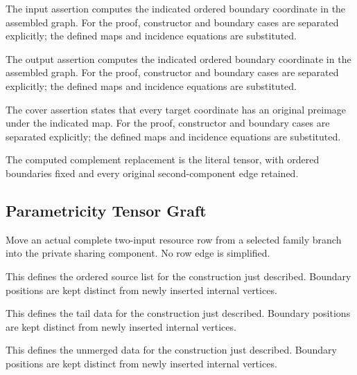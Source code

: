 The input assertion computes the indicated ordered boundary coordinate in the assembled graph.
For the proof, constructor and boundary cases are separated explicitly; the defined maps and incidence equations are substituted.
\par{}

The output assertion computes the indicated ordered boundary coordinate in the assembled graph.
For the proof, constructor and boundary cases are separated explicitly; the defined maps and incidence equations are substituted.
\par{}

The cover assertion states that every target coordinate has an original preimage under the indicated map.
For the proof, constructor and boundary cases are separated explicitly; the defined maps and incidence equations are substituted.
\par{}

The computed complement replacement is the literal tensor, with ordered boundaries fixed and every original second-component edge retained.
\par{}

\subsection{Parametricity Tensor Graft}
Move an actual complete two-input resource row from a selected family branch into the private sharing component. No row edge is simplified.

This defines the ordered source list for the construction just described. Boundary positions are kept distinct from newly inserted internal vertices.
\par{}

This defines the tail data for the construction just described. Boundary positions are kept distinct from newly inserted internal vertices.
\par{}

This defines the unmerged data for the construction just described. Boundary positions are kept distinct from newly inserted internal vertices.
\par{}

